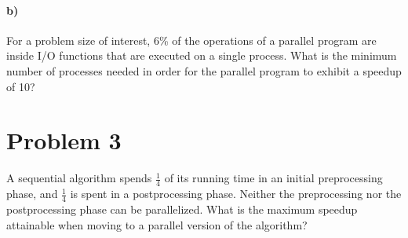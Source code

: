 \documentclass{article}
\begin{document}
\begin{center}
\end{center}
\medskip

\paragraph{b)}
For a problem size of interest, 6\% of the operations of a parallel program are inside I/O functions that are executed on a single process. What is the minimum number of processes needed in order for the parallel program to exhibit a speedup of 10?

\medskip

\begin{center}
\end{center}
\medskip

\section{Problem 3}
A sequential algorithm spends \( \frac{1}{4}  \) of its running time in an initial preprocessing phase, and \( \frac{1}{4}  \) is spent in a postprocessing phase. Neither the preprocessing nor the postprocessing phase can be parallelized. What is the maximum speedup attainable when moving to a parallel version of the algorithm?

\medskip

\begin{center}
\end{center}
\medskip
\end{document}
